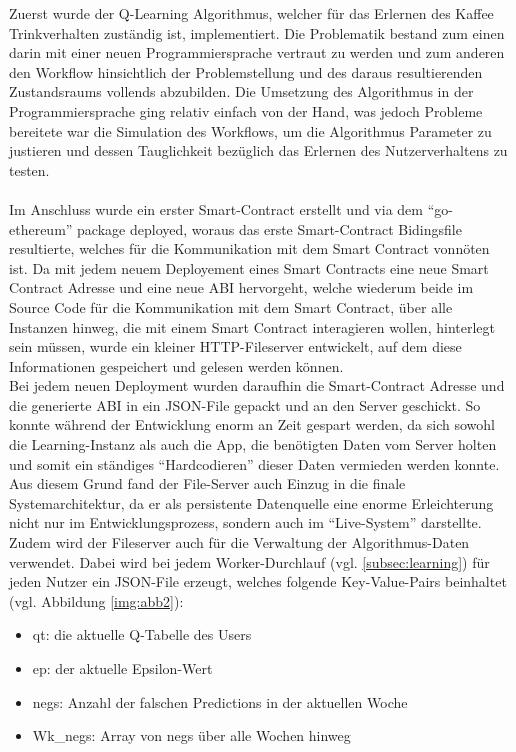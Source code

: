Zuerst wurde der Q-Learning Algorithmus, welcher für das Erlernen des Kaffee Trinkverhalten zuständig ist, implementiert. Die Problematik bestand zum einen darin mit einer neuen Programmiersprache vertraut zu werden und zum anderen den Workflow hinsichtlich der Problemstellung und des daraus resultierenden Zustandsraums vollends abzubilden. Die Umsetzung des Algorithmus in der Programmiersprache ging relativ einfach von der Hand, was jedoch Probleme bereitete war die Simulation des Workflows, um die Algorithmus Parameter zu justieren und dessen Tauglichkeit bezüglich das Erlernen des Nutzerverhaltens zu testen.\\\\
Im Anschluss wurde ein erster Smart-Contract erstellt und via dem “go-ethereum” package deployed, woraus das erste Smart-Contract Bidingsfile resultierte, welches für die Kommunikation mit dem Smart Contract vonnöten ist. Da mit jedem neuem Deployement eines Smart Contracts eine neue Smart Contract Adresse und eine neue ABI hervorgeht, welche wiederum beide im Source Code für die Kommunikation mit dem Smart Contract, über alle Instanzen hinweg, die mit einem Smart Contract interagieren wollen, hinterlegt sein müssen, wurde ein kleiner HTTP-Fileserver entwickelt, auf dem diese Informationen gespeichert und gelesen werden können. \\
Bei jedem neuen Deployment wurden daraufhin die Smart-Contract Adresse und die generierte ABI in ein JSON-File gepackt und an den Server geschickt. So konnte während der Entwicklung enorm an Zeit gespart werden, da sich sowohl die Learning-Instanz als auch die App, die benötigten Daten vom Server holten und somit ein ständiges “Hardcodieren” dieser Daten vermieden werden konnte. \\
Aus diesem Grund fand der File-Server auch Einzug in die finale Systemarchitektur, da er als persistente Datenquelle eine enorme Erleichterung nicht nur im Entwicklungsprozess, sondern auch im “Live-System” darstellte. \\
Zudem wird der Fileserver auch für die Verwaltung der Algorithmus-Daten verwendet. Dabei wird bei jedem Worker-Durchlauf (vgl. \ref{subsec:learning}) für jeden Nutzer ein JSON-File erzeugt, welches folgende Key-Value-Pairs beinhaltet (vgl. Abbildung \ref{img:abb2}): 
\begin{itemize}
	\item qt: die aktuelle Q-Tabelle des Users
	\item ep: der aktuelle Epsilon-Wert
	\item negs: Anzahl der falschen Predictions in der aktuellen Woche
	\item Wk\_negs: Array von negs über alle Wochen hinweg
\end{itemize}


